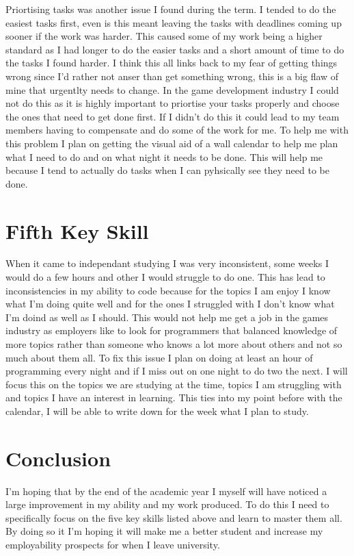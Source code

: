 \documentclass{scrartcl}
\begin{document}
Priortising tasks was another issue I found during the term. I tended to do the easiest tasks first, even is this meant leaving the tasks with deadlines coming up sooner if the work was harder. This caused some of my work being a higher standard as I had longer to do the easier tasks and a short amount of time to do the tasks I found harder. I think this all links back to my fear of getting things wrong since I'd rather not anser than get something wrong, this is a big flaw of mine that urgentlty needs to change. In the game development industry I could not do this as it is highly important to priortise your tasks properly and choose the ones that need to get done first. If I didn't do this it could lead to my team members having to compensate and do some of the work for me. To help me with this problem I plan on getting the visual aid of a wall calendar to help me plan what I need to do and on what night it needs to be done. This will help me because I tend to actually do tasks when I can pyhsically see they need to be done.

\section{Fifth Key Skill}

When it came to independant studying I was very inconsistent, some weeks I would do a few hours and other I would struggle to do one. This has lead to inconsistencies in my ability to code because for the topics I am enjoy I know what I'm doing quite well and for the ones I struggled with I don't  know what I'm doind as well as I should. This would not help me get a job in the games industry as employers like to look for programmers that balanced knowledge of more topics rather than someone who knows a lot more about others and not so much about them all. To fix this issue I plan on doing at least an hour of programming every night and if I miss out on one night to do two the next. I will focus this on the topics we are studying at the time, topics I am struggling with and topics I have an interest in learning. This ties into my point before with the calendar, I will be able to write down for the week what I plan to study.

\section{Conclusion}

I'm hoping that by the end of the academic year I myself will have noticed a large improvement in my ability and my work produced. To do this I need to specifically focus on the five key skills listed above and learn to master them all.  By doing so it I'm hoping it will make me a better student and increase my employability prospects for when I leave university. 



\end{document}
